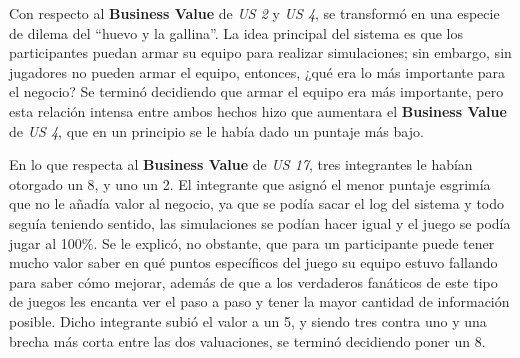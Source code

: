 Con respecto al \textbf{Business Value} de \emph{US 2} y \emph{US 4}, se transformó en una especie de dilema del ``huevo y la gallina''. La idea principal del sistema es que los participantes puedan armar su equipo para realizar simulaciones; sin embargo, sin jugadores no pueden armar el equipo, entonces, ¿qué era lo más importante para el negocio? Se terminó decidiendo que armar el equipo era más importante, pero esta relación intensa entre ambos hechos hizo que aumentara el \textbf{Business Value} de \emph{US 4}, que en un principio se le había dado un puntaje más bajo.

En lo que respecta al \textbf{Business Value} de \emph{US 17}, tres integrantes le habían otorgado un 8, y uno un 2. El integrante que asignó el menor puntaje esgrimía que no le añadía valor al negocio, ya que se podía sacar el log del sistema y todo seguía teniendo sentido, las simulaciones se podían hacer igual y el juego se podía jugar al 100\%. Se le explicó, no obstante, que para un participante puede tener mucho valor saber en qué puntos específicos del juego su equipo estuvo fallando para saber cómo mejorar, además de que a los verdaderos fanáticos de este tipo de juegos les encanta ver el paso a paso y tener la mayor cantidad de información posible. Dicho integrante subió el valor a un 5, y siendo tres contra uno y una brecha más corta entre las dos valuaciones, se terminó decidiendo poner un 8.
